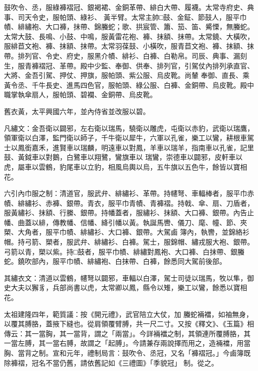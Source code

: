 \begin{pinyinscope}
 鼓吹令、丞，服綠褲褶冠、銀褐裙、金銅革帶、緋白大帶、履襪。太常寺府史、典事、司天令史，服帕頭、綠衫、
 黃半臂。太常主帥□鼓、金鉦、節鼓人，服平巾幘、緋繡袍、大口褲，抹帶、錦螣蛇；歌、拱宸管、簫、笳、笛、觱慄，無螣蛇。太常大鼓、長鳴、小鼓、中鳴，服黃雷花袍、褲、抹額、抹帶。太常鐃、大橫吹，服緋苣文袍、褲、抹額、抹帶。太常羽葆鼓、小橫吹，服青苣文袍、褲、抹額、抹帶。排列官、令史、府史，服黑介幘、緋衫、白褲、白勒帛。司辰、典事、漏刻生，服青褲褶冠、革帶。殿中少監、奉御、供奉、排列官，引駕仗內排列承直官、大將、金吾引駕、押仗、押旗，服帕頭、紫公服、烏皮靴。尚輦
 奉御、直長、乘黃令丞、千牛長史、進馬四色官，服帕頭、綠公服、白褲、金銅帶、烏皮靴。殿中職掌執傘扇人，服帕頭、碧襴、金銅帶、烏皮靴。



 舊衣黃，太平興國六年，並內侍省並改服以碧。



 凡繡文：金吾衛以闢邪，左右衛以瑞馬，驍衛以雕虎，屯衛以赤豹，武衛以瑞鷹，領軍衛以白澤，監門衛以師子，千牛衛以犀牛，六軍以孔雀，樂工以鸞，耕根車駕士以鳳銜嘉禾，進賢車以瑞麟，明遠車以對鳳，羊車以瑞羊，指南車以孔雀，記里鼓、黃鉞車以對鵝，白鷺車以翔鷺，鸞旗車以
 瑞鸞，崇德車以闢邪，皮軒車以虎，屬車以雲鶴，豹尾車以立豹，相風烏輿以烏，五牛旗以五色牛，餘皆以寶相花。



 六引內巾服之制：清道官，服武弁、緋繡衫、革帶。持幰弩、車輻棒者，服平巾赤幘、緋繡衫、赤褲、銀帶。青衣，服平巾青幘、青褲褶。持戟、傘、扇、刀盾者，服黃繡衫、抹額、行縢、銀帶。持幡蓋者，服繡衫、抹額、大口褲、銀帶。內告止幡、曲蓋以緋，傳教幡、信幡、絳引幡以黃。執誕馬轡、儀刀、麾、幢、節、夾槊、大角者，服平巾幘、緋繡衫、大口褲、銀帶。大駕鹵
 簿內，執轡，並錦絡衫帽。持弓箭、槊者，服武弁、緋繡衫、白褲。駕士，服錦帽、繡戎服大袍、銀帶。弓箭以青，槊以紫。持□鼓者，服平巾幘、緋繡對鳳袍、大口褲、白抹帶、銀螣蛇。鐃吹部內，服平巾幘、緋繡袍、白抹帶、白褲，餘悉同大駕前後部。



 其繡衣文：清道以雲鶴，幰弩以闢邪，車輻以白澤，駕士司徒以瑞馬，牧以隼，御史大夫以獬豸，兵部尚書以虎，太常卿以鳳，縣令以雉，樂工以鸞，餘悉以寶相花。



 太祖建隆四年，範質議：按《開元禮》，武官陪立大仗，加
 螣蛇裲襠，如袖無身，以覆其膊胳，蓋掖下縫也。從肩領覆臂膊，共一尺二寸。又按《釋文》、《玉篇》相傳云：其一當胸，其一當背，謂之「兩當」。今詳裲襠之制，其領連所覆膊胳，其一當左膊，其一當右膊，故謂之「起膊」。今請兼存兩說擇而用之，造裲襠，用當胸、當背之制。宣和元年，禮制局言：鼓吹令、丞冠，又名「褲褶冠。」今鹵簿既除褲褶，冠名不當仍舊，請依舊記如《三禮圖》「季貌冠」
 制。從之。



\end{pinyinscope}